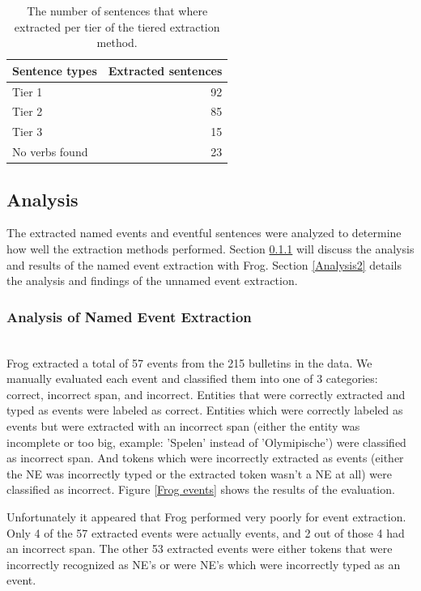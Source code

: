 \documentclass[a4paper, 10pt, conference]{ieeeconf}      %
\begin{document}
\begin{table}
  \begin{center}
    \begin{tabular}{l|r}
    Sentence types & Extracted sentences\\
    \hline
    Tier 1 & 92\\
    Tier 2 & 85\\
    Tier 3 & 15\\
    No verbs found & 23\\
    \end{tabular}
  \end{center}
  \caption{The number of sentences that where extracted per tier of the tiered extraction method.}
  \label{sentence extraction breakdown}
\end{table}

\subsection{Analysis}\label{analysis}
The extracted named events and eventful sentences were analyzed to determine how well the extraction methods performed. Section \ref{Analysis1} will discuss the analysis and results of the named event extraction with Frog. Section \ref{Analysis2} details the analysis and findings of the unnamed event extraction.

\subsubsection{Analysis of Named Event Extraction}\label{Analysis1}~\\
Frog extracted a total of 57 events from the 215 bulletins in the data. We manually evaluated each event and classified them into one of 3 categories: correct, incorrect span, and incorrect. Entities that were correctly extracted and typed as events were labeled as correct. Entities which were correctly labeled as events but were extracted with an incorrect span (either the entity was incomplete or too big, example: 'Spelen' instead of 'Olymipische') were classified as incorrect span. And tokens which were incorrectly extracted as events (either the NE was incorrectly typed or the extracted token wasn't a NE at all) were classified as incorrect. Figure \ref{Frog events} shows the results of the evaluation. 

Unfortunately it appeared that Frog performed very poorly for event extraction. Only 4 of the 57 extracted events were actually events, and 2 out of those 4 had an incorrect span. The other 53 extracted events were either tokens that were incorrectly recognized as NE's or were NE's which were incorrectly typed as an event.
\end{document}
